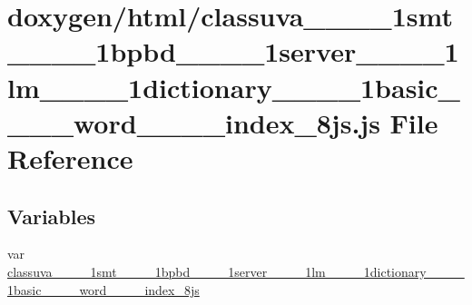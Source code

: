 \hypertarget{classuva____1____1smt____1____1bpbd____1____1server____1____1lm____1____1dictionary____1____1bas9f567e30d8e71e9d5db3bd46ed06b9e5}{}\section{doxygen/html/classuva\+\_\+\+\_\+\_\+\+\_\+1smt\+\_\+\+\_\+\_\+\+\_\+1bpbd\+\_\+\+\_\+\_\+\+\_\+1server\+\_\+\+\_\+\_\+\+\_\+1lm\+\_\+\+\_\+\_\+\+\_\+1dictionary\+\_\+\+\_\+\_\+\+\_\+1basic\+\_\+\+\_\+\+\_\+\+\_\+word\+\_\+\+\_\+\+\_\+\+\_\+index\+\_\+8js.js File Reference}
\label{classuva____1____1smt____1____1bpbd____1____1server____1____1lm____1____1dictionary____1____1bas9f567e30d8e71e9d5db3bd46ed06b9e5}
\subsection*{Variables}
\begin{DoxyCompactItemize}
\item 
var \hyperlink{classuva____1____1smt____1____1bpbd____1____1server____1____1lm____1____1dictionary____1____1bas9f567e30d8e71e9d5db3bd46ed06b9e5_a846b81bf5ed34523599ff11a04dcab0c}{classuva\+\_\+\+\_\+\_\+\+\_\+1smt\+\_\+\+\_\+\_\+\+\_\+1bpbd\+\_\+\+\_\+\_\+\+\_\+1server\+\_\+\+\_\+\_\+\+\_\+1lm\+\_\+\+\_\+\_\+\+\_\+1dictionary\+\_\+\+\_\+\_\+\+\_\+1basic\+\_\+\+\_\+\+\_\+\+\_\+word\+\_\+\+\_\+\+\_\+\+\_\+index\+\_\+8js}
\end{DoxyCompactItemize}


